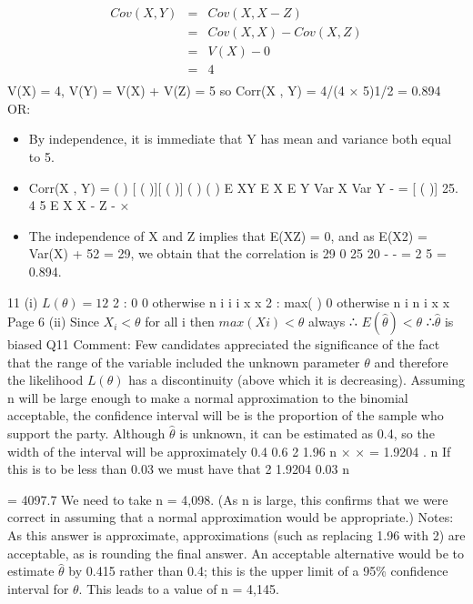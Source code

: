 \documentclass[a4paper,12pt]{article}
\begin{document}
\begin{eqnarray*}
Cov(X , Y) &=& Cov(X , X - Z) \\ &=& Cov(X , X) - Cov(X , Z) \\ &=& V(X) - 0 \\&=& 4\\
\end{eqnarray*}
V(X) = 4, V(Y) = V(X) + V(Z) = 5
so Corr(X , Y) = 4/(4 × 5)1/2 = 0.894
OR:
\begin{itemize}
    \item By independence, it is immediate that Y has mean and variance both equal
to 5.
\item Corr(X , Y) =
( ) [ ( )][ ( )]
( ) ( )
E XY E X E Y
Var X Var Y
- =
[ ( )] 25.
4 5
E X X - Z -
×
\item The independence of X and Z implies that E(XZ) = 0, and as
E(X2) = Var(X) + 52 = 29, we obtain that the correlation is
29 0 25
20
- - =
2
5
= 0.894.
\end{itemize}

11 (i) $L(\theta) = 1 2$
2
: 0
0 otherwise
n
i
i i
x
x
2
: max( )
0 otherwise
n
i
n i
x
x
Page 6
(ii) Since $X_i < \theta$ for all i
then $max(Xi) < \theta$ always
∴ $E( \hat{\theta}) < \theta$ ∴$\hat{\theta}$ is biased
Q11 Comment: Few candidates appreciated the significance of the fact that the range of the
variable included the unknown parameter $\theta$ and therefore the likelihood $L(\theta)$ has a
discontinuity (above which it is decreasing).
 Assuming n will be large enough to make a normal approximation to the
binomial acceptable, the confidence interval will be
is the proportion of the sample who support the party.
Although $\hat{\theta}$ is unknown, it can be estimated as 0.4, so the width of the interval
will be approximately
0.4 0.6
2 1.96
n
× × =
1.9204
.
n
If this is to be less than 0.03 we must have that
2 1.9204
0.03
n

= 4097.7
We need to take n = 4,098.
(As n is large, this confirms that we were correct in assuming that a normal
approximation would be appropriate.)
Notes: As this answer is approximate, approximations (such as replacing 1.96
with 2) are acceptable, as is rounding the final answer.
An acceptable alternative would be to estimate $\hat{\theta}$ by 0.415 rather than 0.4; this
is the upper limit of a 95\% confidence interval for $\theta$. This leads to a value of
n = 4,145.
\end{document}
